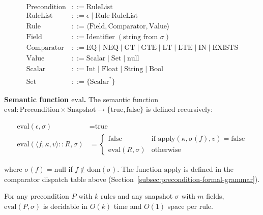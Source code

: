 \begin{align*}
    \text{Precondition} &::= \text{RuleList} \\
    \text{RuleList} &::= \epsilon \;|\; \text{Rule} \; \text{RuleList} \\
    \text{Rule} &::= \langle \text{Field}, \text{Comparator}, \text{Value} \rangle \\
    \text{Field} &::= \text{Identifier} \; (\text{string from } \sigma) \\
    \text{Comparator} &::= \text{EQ} \;|\; \text{NEQ} \;|\; \text{GT} \;|\; \text{GTE} \;|\; \text{LT} \;|\; \text{LTE} \;|\; \text{IN} \;|\; \text{EXISTS} \\
    \text{Value} &::= \text{Scalar} \;|\; \text{Set} \;|\; \text{null} \\
    \text{Scalar} &::= \text{Int} \;|\; \text{Float} \;|\; \text{String} \;|\; \text{Bool} \\
    \text{Set} &::= \{ \text{Scalar}^* \}
\end{align*}

\textbf{Semantic function $\text{eval}$.} The semantic function $\text{eval}: \text{Precondition} \times \text{Snapshot} \to \{\text{true}, \text{false}\}$ is defined recursively:

\begin{align*}
    \text{eval}(\epsilon, \sigma) &= \text{true} \\
    \text{eval}(\langle f, \kappa, v \rangle :: R, \sigma) &=
        \begin{cases}
            \text{false} & \text{if } \text{apply}(\kappa, \sigma(f), v) = \text{false} \\
            \text{eval}(R, \sigma) & \text{otherwise}
        \end{cases}
\end{align*}

where $\sigma(f) = \text{null}$ if $f \notin \text{dom}(\sigma)$. The function $\text{apply}$ is defined in the comparator dispatch table above (Section~\ref{subsec:precondition-formal-grammar}).

\begin{theorem}\label{thm:precondition-decidability}
For any precondition $P$ with $k$ rules and any snapshot $\sigma$ with $m$ fields, $\text{eval}(P, \sigma)$ is decidable in $O(k)$ time and $O(1)$ space per rule.
\end{theorem}

